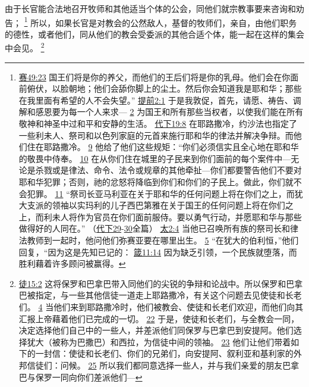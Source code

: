 \documentclass[12pt, a4paper, oneside]{ctexart}
\newcounter{parnum}[section]
\newcommand{\N}{%
   \noindent\refstepcounter{parnum}%
    \makebox[\parindent][l]{\textbf{\arabic{parnum}.}}}
\begin{document}
\N 由于长官能合法地召开牧师和其他适当个体的公会，同他们就宗教事要来咨询和劝告；
	\footnote {
		\href{https://biblehub.com/isaiah/49-23.htm}{赛49:23} 国王们将是你的养父，而他们的王后们将是你的乳母。他们会在你面前俯伏，以脸朝地；他们会舔你脚上的尘土。然后你会知道我是耶和华；那些在我里面有希望的人不会失望。”
		\href{https://biblehub.com/1_timothy/2-1.htm}{提前2:1} 于是我敦促，首先，请愿、祷告、调解和感恩要为每一个人来求---
		\href{https://biblehub.com/1_timothy/2-2.htm}{2} 为国王和所有那些当权者，以使我们能在所有敬神和神圣中过和平和安静的生活。
		\href{https://biblehub.com/2_chronicles/19-8.htm}{代下19:8} 在耶路撒冷，约沙法也指定了一些利未人、祭司和以色列家庭的元首来施行耶和华的律法并解决争辩。而他们住在耶路撒冷。
		\href{https://biblehub.com/2_chronicles/19-9.htm}{9} 他给了他们这些规矩：“你们必须信实且全心地在耶和华的敬畏中侍奉。
		\href{https://biblehub.com/2_chronicles/19-10.htm}{10} 在从你们住在城里的子民来到你们面前的每个案件中---无论是杀戮或是律法、命令、法令或规章的其他牵扯---你们都要警告他们不要对耶和华犯罪；否则，祂的忿怒将降临到你们和你们的子民上。做此，你们就不会犯罪。
		\href{https://biblehub.com/2_chronicles/19-11.htm}{11} “祭司长亚马利亚在关于耶和华的任何问题上将在你们之上，而犹大支派的领袖以实玛利的儿子西巴第雅在关于国王的任何问题上将在你们之上，而利未人将作为官员在你们面前服侍。要以勇气行动，并愿耶和华与那些做得好的人同在。”
		（\href{https://biblehub.com/niv/2_chronicles/29.htm}{代下29}-\href{https://biblehub.com/niv/2_chronicles/30.htm}{30}全篇）
		\href{https://biblehub.com/matthew/2-4.htm}{太2:4} 当他已召唤所有族的祭司长和律法教师到一起时，他问他们弥赛亚要在哪里出生。
		\href{https://biblehub.com/matthew/2-5.htm}{5} “在犹大的伯利恒，”他们回复，“因为这是先知已记的：
		\href{https://biblehub.com/proverbs/11-14.htm}{箴11:14} 因为缺乏引领，一个民族就堕落，而胜利藉着许多顾问被赢得。
	}
	所以，如果长官是对教会的公然敌人，基督的牧师们，亲自，由他们职务的德性，或者他们，同从他们的教会受委派的其他合适个体，能一起在这样的集会中会见。
	\footnote {
		\href{https://biblehub.com/acts/15-2.htm}{徒15:2} 这将保罗和巴拿巴带入同他们的尖锐的争辩和论战中。所以保罗和巴拿巴被指定，与一些其他信徒一道走上耶路撒冷，有关这个问题去见使徒和长老们。
		\href{https://biblehub.com/acts/15-4.htm}{4} 当他们来到耶路撒冷时，他们被教会、使徒和长老们欢迎，而他们向其汇报上帝藉着他们已完成的一切。
		\href{https://biblehub.com/acts/15-22.htm}{22} 于是，使徒和长老们，与全教会一同，决定选择他们自己中的一些人，并差派他们同保罗与巴拿巴到安提阿。他们选择犹大（被称为巴撒巴）和西拉，为信徒中间的领袖。
		\href{https://biblehub.com/acts/15-23.htm}{23} 他们让他们带着如下的一封信：使徒和长老们、你们的兄弟们，向安提阿、叙利亚和基利家的外邦信徒们：问候。
		\href{https://biblehub.com/acts/15-25.htm}{25} 所以我们都同意选择一些人，并与我们亲爱的朋友巴拿巴与保罗一同向你们差派他们---
	}
\end{document}

